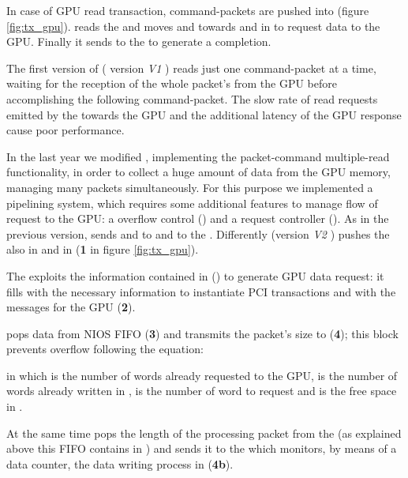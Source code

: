 In case of GPU read transaction, command-packets are pushed into
 (figure \ref{fig:tx_gpu}). \ptoptx reads the
 and moves \header and \footer towards  and  in  to request data to the
GPU. Finally it sends  to the  to
generate a completion.


The first version of \ptoptx ( version \textit{V1} ) reads just one command-packet at a
time, waiting for the reception of the whole packet's \payload from
the GPU before accomplishing the following command-packet.
The slow rate of read requests emitted by the \ptoptx towards the
GPU and the additional latency of the GPU response cause poor
performance.


In the last year we modified \ptoptx, implementing the packet-command
multiple-read functionality, in order to collect a huge amount of data
from the GPU memory, managing many \apenetp packets simultaneously.
For this purpose we implemented a pipelining system, which requires
some additional features to manage flow of request to the GPU:
a  overflow control
() and a request controller ().
As in the previous version,  sends \header and
\footer to  and  to the .
Differently \ptoptx (version \textit{V2} ) pushes the \header also in 
and  in  (\textbf{1} in figure
\ref{fig:tx_gpu}).

The \nios exploits the information contained in 
() to generate GPU data request: it fills  with the necessary information to instantiate PCI transactions
and  with the messages for the GPU
(\textbf{2}).


 pops data from NIOS FIFO (\textbf{3}) and
transmits the packet's size to  (\textbf{4}); this
block prevents  overflow following the equation:




in which  is the number of words already requested to the
GPU,  is the number of words already written in ,  is the number of word to request and  is the
free space in .

At the same time  pops the length of the processing
packet from the  (as explained above this FIFO
contains \header in \ptoptx) and sends it to the  which monitors, by means of a data counter, the data writing
process in  (\textbf{4b}).

